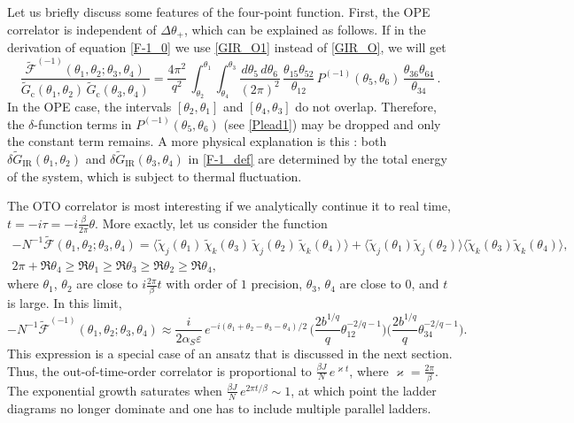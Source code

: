 \documentclass[12pt]{article}
\newcommand{\blangle}{\bigl\langle}
\newcommand{\brangle}{\bigr\rangle}
\newcommand*{\bcorr}[1]{\blangle{#1}\brangle}
\renewcommand{\ge}{\geqslant}
\newcommand{\kap}{\varkappa}
\newcommand{\calF}{\mathcal{F}}
\newcommand{\cc}{\mathrm{c}}
\newcommand{\IR}{\text{IR}}
\newcommand{\tG}{\widetilde{G}}
\newcommand{\tF}{\widetilde{\calF}}
\newcommand{\vep}{\varepsilon}
\begin{document}
Let us briefly discuss some features of the four-point function. First, the OPE correlator is independent of $\Delta\theta_{+}$, which can be explained as follows. If in the derivation of equation \eqref{F-1_0} we use \eqref{GIR_O1} instead of \eqref{GIR_O}, we will get
\begin{equation}\label{F-1_1}
\frac{\tF^{(-1)}(\theta_1,\theta_2;\theta_3,\theta_4)}
{\tG_{\cc}(\theta_1,\theta_2)\,\tG_{\cc}(\theta_3,\theta_4)}
=\frac{4\pi^2}{q^2}\,
\int_{\theta_2}^{\theta_1}\int_{\theta_4}^{\theta_3}
\frac{d\theta_5\,d\theta_6}{(2\pi)^2}\,
\frac{\theta_{15}\theta_{52}}{\theta_{12}}\,
P^{(-1)}(\theta_5,\theta_6)\,
\frac{\theta_{36}\theta_{64}}{\theta_{34}}\,.
\end{equation}
In the OPE case, the intervals $[\theta_2,\theta_1]$ and $[\theta_4,\theta_3]$ do not overlap. Therefore, the $\delta$-function terms in $P^{(-1)}(\theta_5,\theta_6)$ (see \eqref{Plead1}) may be dropped and only the constant term remains. A more physical explanation is this \cite{MS16}: both $\delta\tG_{\IR}(\theta_1,\theta_2)$ and $\delta\tG_{\IR}(\theta_3,\theta_4)$ in \eqref{F-1_def} are determined by the total energy of the system, which is subject to thermal fluctuation.

The OTO correlator is most interesting if we analytically continue it to real time, $t=-i\tau=-i\frac{\beta}{2\pi}\theta$. More exactly, let us consider the function
\begin{equation}\label{ccorr}
\begin{gathered}
-N^{-1}\tF(\theta_1,\theta_2;\theta_3,\theta_4)
=\bcorr{\widetilde{\chi}_j(\theta_1)\,\widetilde{\chi}_k(\theta_3)\,
\widetilde{\chi}_j(\theta_2)\,\widetilde{\chi}_k(\theta_4)}
+\bcorr{\widetilde{\chi}_j(\theta_1)\widetilde{\chi}_j(\theta_2)}
\bcorr{\widetilde{\chi}_k(\theta_3)\widetilde{\chi}_k(\theta_4)},
\\[3pt]
2\pi+\Re\theta_4 \ge\Re\theta_1 \ge\Re\theta_3 \ge \Re\theta_2 \ge\Re\theta_4,
\end{gathered}
\end{equation}
where $\theta_1$, $\theta_2$ are close to $i\frac{2\pi}{\beta}t$ with order of $1$ precision, $\theta_3$, $\theta_4$ are close to $0$, and $t$ is large. In this limit,
\begin{equation}\label{OTOC-1}
{-N^{-1}}\tF^{(-1)}(\theta_1,\theta_2;\theta_3,\theta_4)
\approx \frac{i}{2\alpha_S\vep}\,
e^{-i(\theta_1+\theta_2-\theta_3-\theta_4)/2}\,
\biggl(\frac{2b^{1/q}}{q}\theta_{12}^{-2/q-1}\biggr)
\biggl(\frac{2b^{1/q}}{q}\theta_{34}^{-2/q-1}\biggr).
\end{equation}
This expression is a special case of an ansatz that is discussed in the next section. Thus, the out-of-time-order correlator is proportional to $\frac{\beta J}{N}\, e^{\kap t}$, where $\kap=\frac{2\pi}{\beta}$. The exponential growth saturates when $\frac{\beta J}{N}\,e^{2\pi t/\beta}\sim 1$, at which point the ladder diagrams no longer dominate and one has to include multiple parallel ladders.
\end{document}
